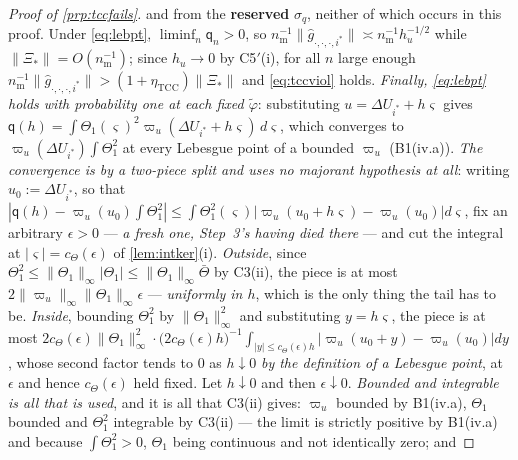 \begin{proof}[Proof of \cref{prp:tccfails}]
and from the \textbf{reserved} $\sigma_q$, neither of which occurs in this proof.
Under \eqref{eq:lebpt}, $\liminf_n\mathsf q_n>0$, so
$n_{\mathrm m}^{-1}\|\hat g_{\cdot,\cdot,\cdot,i^\ast}\|\asymp n_{\mathrm m}^{-1}h_u^{-1/2}$ while
$\|\Xi_\ast\|=O(n_{\mathrm m}^{-1})$; since $h_u\to0$ by C5$'$(i), for all $n$ large enough
$n_{\mathrm m}^{-1}\|\hat g_{\cdot,\cdot,\cdot,i^\ast}\|>(1+\eta_{\mathrm{TCC}})\|\Xi_\ast\|$ and
\eqref{eq:tccviol} holds. \emph{Finally, \eqref{eq:lebpt} holds with probability one at each fixed
$\tilde\varphi$}: substituting $u=\Delta U_{i^\ast}+h\varsigma$ gives
$\mathsf q(h)=\int\Theta_1(\varsigma)^{2}\varpi_u(\Delta U_{i^\ast}+h\varsigma)\,d\varsigma$, which
converges to $\varpi_u(\Delta U_{i^\ast})\int\Theta_1^{2}$ at every Lebesgue point of a bounded
$\varpi_u$ (B1(iv.a)). \emph{The convergence is by a two-piece split and uses no majorant
hypothesis at all}: writing $u_0:=\Delta U_{i^\ast}$, so that
$|\mathsf q(h)-\varpi_u(u_0)\int\Theta_1^{2}|\le\int\Theta_1^{2}(\varsigma)|\varpi_u(u_0+h\varsigma)-\varpi_u(u_0)|d\varsigma$,
fix an arbitrary $\epsilon>0$ --- \emph{a fresh one, Step~3's having died there} --- and cut the
integral at $|\varsigma|=c_\Theta(\epsilon)$ of \cref{lem:intker}(i). \emph{Outside}, since
$\Theta_1^{2}\le\|\Theta_1\|_\infty|\Theta_1|\le\|\Theta_1\|_\infty\bar\Theta$ by C3(ii), the piece is at
most $2\|\varpi_u\|_\infty\|\Theta_1\|_\infty\epsilon$ --- \emph{uniformly in $h$}, which is the only
thing the tail has to be. \emph{Inside}, bounding $\Theta_1^{2}$ by $\|\Theta_1\|^{2}_\infty$ and
substituting $y=h\varsigma$, the piece is at most
$2c_\Theta(\epsilon)\|\Theta_1\|^{2}_\infty\cdot\big(2c_\Theta(\epsilon)h\big)^{-1}\!\int_{|y|\le c_\Theta(\epsilon)h}|\varpi_u(u_0+y)-\varpi_u(u_0)|dy$,
whose second factor tends to $0$ as $h\downarrow0$ \emph{by the definition of a Lebesgue point}, at
$\epsilon$ and hence $c_\Theta(\epsilon)$ held fixed. Let $h\downarrow0$ and then $\epsilon\downarrow0$.
\emph{Bounded and integrable is all that is used}, and it is all that C3(ii) gives: $\varpi_u$ bounded
by B1(iv.a), $\Theta_1$ bounded and $\Theta_1^{2}$ integrable by C3(ii) --- the limit is strictly positive by
B1(iv.a) and because $\int\Theta_1^{2}>0$, $\Theta_1$ being continuous and not identically zero; and

\end{proof}
